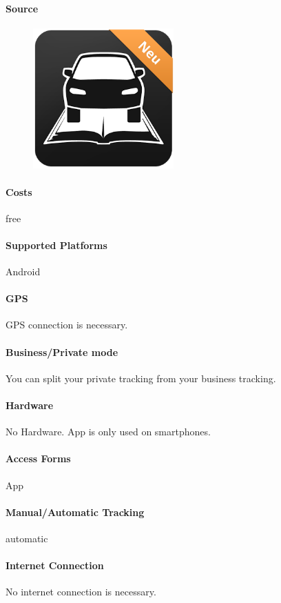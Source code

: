 \paragraph{Source} 
\begin{figure}
  \begin{center}
    \includegraphics[width=0.48\textwidth]{mylog}
  \end{center}
\end{figure}
\paragraph{Costs} free
\paragraph{Supported Platforms} Android
\paragraph{GPS} GPS connection is necessary.
\paragraph{Business/Private mode} You can split your private tracking from your business tracking.
\paragraph{Hardware} No Hardware. App is only used on smartphones.
\paragraph{Access Forms} App
\paragraph{Manual/Automatic Tracking} automatic
\paragraph{Internet Connection} No internet connection is necessary.
